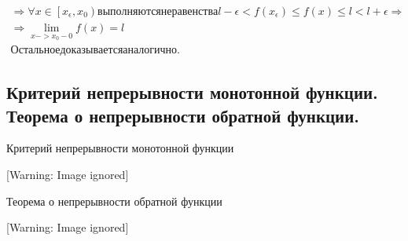 \documentclass[a4paper]{article}
\begin{document}
\begin{equation*}
\begin{gathered}
\Rightarrow \forall x\in \left[x_{\epsilon
},x_0\right)\mathit{\text{в}\text{ы}\text{п}\text{о}\text{л}\text{н}\text{я}\text{ю}\text{т}\text{с}\text{я}}\mathit{\text{н}\text{е}\text{р}\text{а}\text{в}\text{е}\text{н}\text{с}\text{т}\text{в}\text{а}}l-\epsilon
<f(x_{\epsilon })\le f(x)\le l<l+\epsilon \Rightarrow \\\Rightarrow \lim
_{x->x_0-0}f(x)=l\\\mathit{\text{О}\text{с}\text{т}\text{а}\text{л}\text{ь}\text{н}\text{о}\text{е}}\mathit{\text{д}\text{о}\text{к}\text{а}\text{з}\text{ы}\text{в}\text{а}\text{е}\text{т}\text{с}\text{я}}\mathit{\text{а}\text{н}\text{а}\text{л}\text{о}\text{г}\text{и}\text{ч}\text{н}\text{о}.}\end{gathered}
\end{equation*}
\subsection{Критерий непрерывности монотонной функции. Теорема о непрерывности обратной функции.}
Критерий непрерывности монотонной функции

  [Warning: Image ignored] %
 


\bigskip

Теорема о непрерывности обратной функции

  [Warning: Image ignored] %
 
\end{document}
